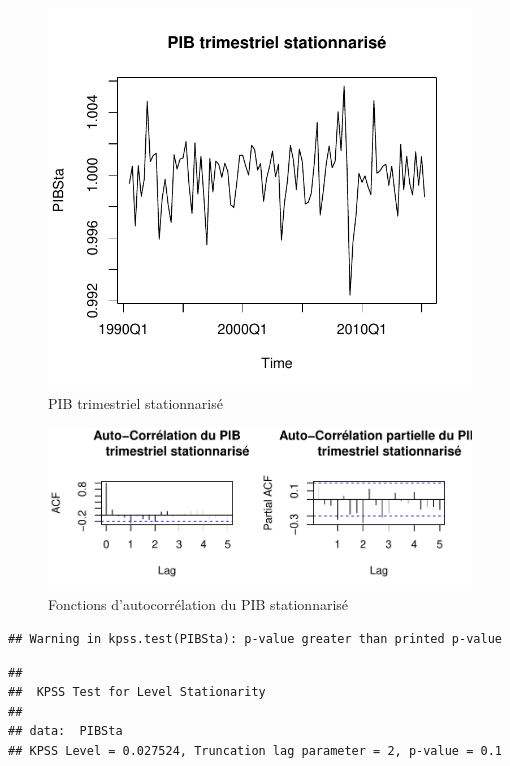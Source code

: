 \documentclass[11pt,]{article}
\begin{document}
\begin{figure}[htbp]
\centering
\includegraphics{Rapport_final_files/figure-latex/unnamed-chunk-15-1.pdf}
\caption{\label{fig13} PIB trimestriel stationnarisé}
\end{figure}

\begin{figure}[htbp]
\centering
\includegraphics{Rapport_final_files/figure-latex/unnamed-chunk-16-1.pdf}
\caption{\label{fig14} Fonctions d'autocorrélation du PIB stationnarisé}
\end{figure}

\begin{verbatim}
## Warning in kpss.test(PIBSta): p-value greater than printed p-value
\end{verbatim}

\begin{verbatim}
## 
##  KPSS Test for Level Stationarity
## 
## data:  PIBSta
## KPSS Level = 0.027524, Truncation lag parameter = 2, p-value = 0.1
\end{verbatim}
\end{document}
